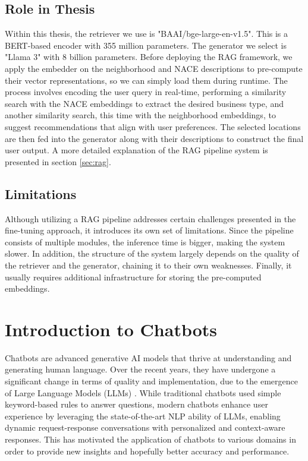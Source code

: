 \subsection{Role in Thesis}

Within this thesis, the retriever we use is "BAAI/bge-large-en-v1.5". This is a BERT-based encoder with 355 million parameters. The generator we select is "Llama 3" with 8 billion parameters. Before deploying the RAG framework, we apply the embedder on the neighborhood and NACE descriptions to pre-compute their vector representations, so we can simply load them during runtime. The process involves encoding the user query in real-time, performing a similarity search with the NACE embeddings to extract the desired business type, and another similarity search, this time with the neighborhood embeddings, to suggest recommendations that align with user preferences. The selected locations are then fed into the generator along with their descriptions to construct the final user output. A more detailed explanation of the RAG pipeline system is presented in section \ref{sec:rag}.




\subsection{Limitations}

Although utilizing a RAG pipeline addresses certain challenges presented in the fine-tuning approach, it introduces its own set of limitations. Since the pipeline consists of multiple modules, the inference time is bigger, making the system slower. In addition, the structure of the system largely depends on the quality of the retriever and the generator, chaining it to their own weaknesses. Finally, it usually requires additional infrastructure for storing the pre-computed embeddings. 


\section{Introduction to Chatbots}

Chatbots are advanced generative AI models that thrive at understanding and generating human language. Over the recent years, they have undergone a significant change in terms of quality and implementation, due to the emergence of Large Language Models (LLMs) \cite{chatbots_hundertmark2024}. While traditional chatbots used simple keyword-based rules to answer questions, modern chatbots  enhance user experience by leveraging the state-of-the-art NLP ability of LLMs, enabling dynamic request-response conversations with personalized and context-aware responses. This has motivated the application of chatbots to various domains in order to provide new insights and hopefully better accuracy and performance.

